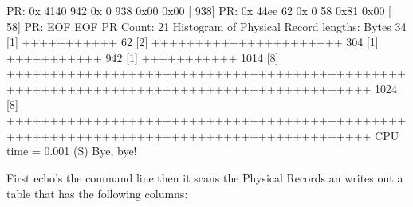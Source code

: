 \documentclass[letterpaper,10pt,english]{sphinxmanual}
\begin{document}
\begin{sphinxVerbatim}[commandchars=\\\{\}]
PR: 0x    4140     942  0x   0     938  \PYGZhy{}\PYGZhy{}\PYGZhy{}\PYGZhy{}\PYGZhy{}\PYGZhy{}  \PYGZhy{}\PYGZhy{}\PYGZhy{}\PYGZhy{}\PYGZhy{}\PYGZhy{}  \PYGZhy{}\PYGZhy{}\PYGZhy{}\PYGZhy{}\PYGZhy{}\PYGZhy{} 0x00 0x00 [     938]
PR: 0x    44ee      62  0x   0      58  \PYGZhy{}\PYGZhy{}\PYGZhy{}\PYGZhy{}\PYGZhy{}\PYGZhy{}  \PYGZhy{}\PYGZhy{}\PYGZhy{}\PYGZhy{}\PYGZhy{}\PYGZhy{}  \PYGZhy{}\PYGZhy{}\PYGZhy{}\PYGZhy{}\PYGZhy{}\PYGZhy{} 0x81 0x00 [      58]
PR: EOF
\PYGZhy{}\PYGZhy{}\PYGZhy{}\PYGZhy{}\PYGZhy{}\PYGZhy{}\PYGZhy{}\PYGZhy{}\PYGZhy{}\PYGZhy{}\PYGZhy{}\PYGZhy{}\PYGZhy{}\PYGZhy{}\PYGZhy{}\PYGZhy{}\PYGZhy{}\PYGZhy{}\PYGZhy{}\PYGZhy{}\PYGZhy{}\PYGZhy{}\PYGZhy{}\PYGZhy{}\PYGZhy{}\PYGZhy{}\PYGZhy{}\PYGZhy{}\PYGZhy{}\PYGZhy{}\PYGZhy{}\PYGZhy{}\PYGZhy{}\PYGZhy{}\PYGZhy{}\PYGZhy{}\PYGZhy{}\PYGZhy{}\PYGZhy{} EOF \PYGZhy{}\PYGZhy{}\PYGZhy{}\PYGZhy{}\PYGZhy{}\PYGZhy{}\PYGZhy{}\PYGZhy{}\PYGZhy{}\PYGZhy{}\PYGZhy{}\PYGZhy{}\PYGZhy{}\PYGZhy{}\PYGZhy{}\PYGZhy{}\PYGZhy{}\PYGZhy{}\PYGZhy{}\PYGZhy{}\PYGZhy{}\PYGZhy{}\PYGZhy{}\PYGZhy{}\PYGZhy{}\PYGZhy{}\PYGZhy{}\PYGZhy{}\PYGZhy{}\PYGZhy{}\PYGZhy{}\PYGZhy{}\PYGZhy{}\PYGZhy{}\PYGZhy{}\PYGZhy{}\PYGZhy{}\PYGZhy{}\PYGZhy{}
PR Count: 21
Histogram of Physical Record lengths:
Bytes
   34 [1] \textbar{} +++++++++++
   62 [2] \textbar{} ++++++++++++++++++++++
  304 [1] \textbar{} +++++++++++
  942 [1] \textbar{} +++++++++++
 1014 [8] \textbar{} ++++++++++++++++++++++++++++++++++++++++++++++++++++++++++++++++++++++++++++++++++++++++
 1024 [8] \textbar{} ++++++++++++++++++++++++++++++++++++++++++++++++++++++++++++++++++++++++++++++++++++++++
CPU time =    0.001 (S)
Bye, bye!
\end{sphinxVerbatim}

First  echo’s the command line then it scans the Physical Records an writes out a table that has the following columns:
\end{document}
